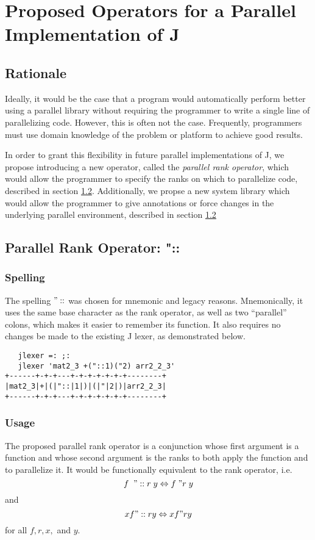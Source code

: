 \chapter{Proposed Operators for a Parallel Implementation of J} %
\label{paraop}

\section{Rationale}
Ideally, it would be the case that a program would automatically perform better using a parallel library 
without requiring the programmer to write a single line of parallelizing code. 
However, this is often not the case. %
Frequently, programmers must use domain knowledge of the problem or platform to achieve good results. 

In order to grant this flexibility in future parallel implementations of J, 
we propose introducing a new operator, called the \textit{parallel rank operator}, 
which would allow the programmer to specify the ranks on which to parallelize code, 
described in section \ref{prank}.
Additionally, we propse a new system library
which would allow the programmer to give annotations or force changes in the underlying parallel environment,
described in section \ref{prank}

\section{Parallel Rank Operator: "::}
\label{prank}

\subsection{Spelling}
The spelling $"::$ was chosen for mnemonic and legacy reasons. 
Mnemonically, it uses the same base character as the rank operator, 
as well as two ``parallel'' colons, which makes it easier to remember its function.
It also requires no changes be made to the existing J lexer\cite{ioj}, 
as demonstrated below.

\begin{verbatim}
   jlexer =: ;:
   jlexer 'mat2_3 +("::1)("2) arr2_2_3'
+------+-+-+---+-+-+-+-+-+-+--------+
|mat2_3|+|(|"::|1|)|(|"|2|)|arr2_2_3|
+------+-+-+---+-+-+-+-+-+-+--------+
\end{verbatim}

\subsection{Usage}
The proposed parallel rank operator is a conjunction 
whose first argument is a function 
and whose second argument is the ranks to both apply the function and to parallelize it. 
It would be functionally equivalent to the rank operator, i.e. 
\[f\;\;"::r\;y \Leftrightarrow f\;"r\;y\] and \[x f"::r y \Leftrightarrow x f"r y\] for all $f, r, x,$ and $y$.

